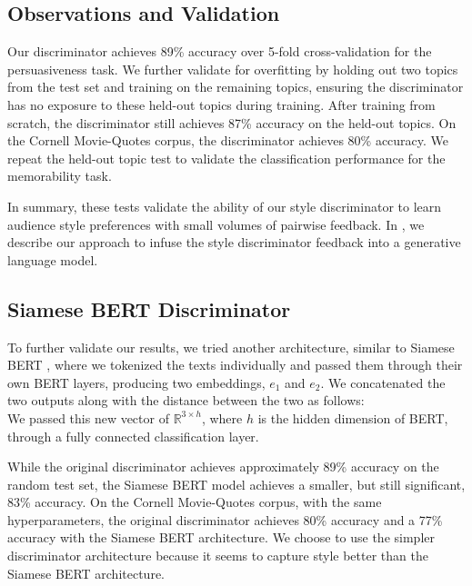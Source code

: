 \subsection{Observations and Validation}
\label{subsec:discrim_obse}
Our discriminator achieves 89\% accuracy over 5-fold cross-validation for the persuasiveness task. We further validate for overfitting by holding out two topics from the test set and training on the remaining topics, ensuring the discriminator has no exposure to these held-out topics during training. After training from scratch, the discriminator still achieves 87\% accuracy on the held-out topics. On the Cornell Movie-Quotes corpus, the discriminator achieves  80\% accuracy. We repeat the held-out topic test to validate the classification performance for the memorability task.

In summary, these tests validate the ability of our style discriminator to learn audience style preferences with small volumes of pairwise feedback. In , we describe our approach to infuse the style discriminator feedback into a generative language model.

\subsection{Siamese BERT Discriminator}
\label{subsec:siamesebert}

To further validate our results, we tried another architecture, similar to Siamese BERT \citep{reimers2019}, where we tokenized the texts individually and passed them through their own BERT layers, producing two embeddings, $e_1$ and $e_2$. We concatenated the two outputs along with the distance between the two as follows:
\begin{equation}
    [e_1 ; e_2 ; |e_2 - e_1|]
\end{equation}
We passed this new vector of $\mathbb{R}^{3 \times h}$, where $h$ is the hidden dimension of BERT, through a fully connected classification layer.

While the original discriminator achieves approximately 89\% accuracy on the random test set, the Siamese BERT model achieves a smaller, but still significant, 83\% accuracy. On the Cornell Movie-Quotes corpus, with the same hyperparameters, the original discriminator achieves 80\% accuracy and a 77\% accuracy with the Siamese BERT architecture. We choose to use the simpler discriminator architecture because it seems to capture style better than the Siamese BERT architecture. 